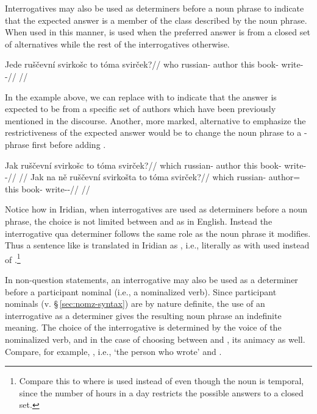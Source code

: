 Interrogatives may also be used as determiners before a noun phrase to indicate
that the expected answer is a member of the class described by the noun phrase.
When used in this manner,  is used when the preferred answer is
from a closed set of alternatives while the rest of the interrogatives
otherwise.

\pex
\begingl
\gla Jede ruščevní svirkošc to tóma svirček?//
\glb who russian-\Att{} author this book-\Acc{} write-\Av{}-\Pf{}//
\glft {}//
\endgl
\xe

In the example above, we can replace  with  to
indicate that the answer is expected to be from a specific set of authors which
have been previously mentioned in the discourse. Another, more marked,
alternative to emphasize the restrictiveness of the expected answer would be to
change the noun phrase to a -phrase first before adding .

\pex
\a\begingl
\gla Jak ruščevní svirkošc to tóma svirček?//
\glb which russian-\Att{} author this book-\Acc{} write-\Av{}-\Pf{}//
\glft {}//
\endgl
\a\begingl
\gla Jak na ně ruščevní svirkošta to tóma svirček?//
\glb which \Loc{} \Pl{} russian-\Att{} author=\Acc{} this book-\Acc{} write-\Av{}-\Pf{}//
\glft {}//
\endgl
\xe

Notice how in Iridian, when interrogatives are used as determiners before a noun
phrase, the choice is not limited between  and  as in
English. Instead the interrogative qua determiner follows the same role as the
noun phrase it modifies. Thus a sentence like 
is translated in Iridian as , i.e., literally as
 with  used instead of
.\footnote{Compare this to  where
 is used instead of  even though the noun  is
temporal, since the number of hours in a day restricts the possible answers to a
closed set.}

In non-question statements, an interrogative may also be used as a determiner
before a participant nominal (i.e., a nominalized verb). Since participant
nominals (v. \S\,\ref{sec:nomz-syntax}) are by nature definite, the use of an
interrogative as a determiner gives the resulting noun phrase an indefinite
meaning. The choice of the interrogative is determined by the voice of the
nominalized verb, and in the case of choosing between  and ,
its animacy as well. Compare, for example,
, i.e., `the person who wrote' and
.

